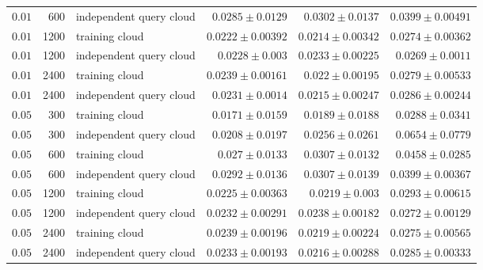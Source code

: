 \begin{longtable}{r r L{0.25\textwidth} r r r}
$0.01$ & 600 & independent query cloud & $0.0285\pm 0.0129$ & $0.0302\pm 0.0137$ & $0.0399\pm 0.00491$ \\
$0.01$ & 1200 & training cloud & $0.0222\pm 0.00392$ & $0.0214\pm 0.00342$ & $0.0274\pm 0.00362$ \\
$0.01$ & 1200 & independent query cloud & $0.0228\pm 0.003$ & $0.0233\pm 0.00225$ & $0.0269\pm 0.0011$ \\
$0.01$ & 2400 & training cloud & $0.0239\pm 0.00161$ & $0.022\pm 0.00195$ & $0.0279\pm 0.00533$ \\
$0.01$ & 2400 & independent query cloud & $0.0231\pm 0.0014$ & $0.0215\pm 0.00247$ & $0.0286\pm 0.00244$ \\
$0.05$ & 300 & training cloud & $0.0171\pm 0.0159$ & $0.0189\pm 0.0188$ & $0.0288\pm 0.0341$ \\
$0.05$ & 300 & independent query cloud & $0.0208\pm 0.0197$ & $0.0256\pm 0.0261$ & $0.0654\pm 0.0779$ \\
$0.05$ & 600 & training cloud & $0.027\pm 0.0133$ & $0.0307\pm 0.0132$ & $0.0458\pm 0.0285$ \\
$0.05$ & 600 & independent query cloud & $0.0292\pm 0.0136$ & $0.0307\pm 0.0139$ & $0.0399\pm 0.00367$ \\
$0.05$ & 1200 & training cloud & $0.0225\pm 0.00363$ & $0.0219\pm 0.003$ & $0.0293\pm 0.00615$ \\
$0.05$ & 1200 & independent query cloud & $0.0232\pm 0.00291$ & $0.0238\pm 0.00182$ & $0.0272\pm 0.00129$ \\
$0.05$ & 2400 & training cloud & $0.0239\pm 0.00196$ & $0.0219\pm 0.00224$ & $0.0275\pm 0.00565$ \\
$0.05$ & 2400 & independent query cloud & $0.0233\pm 0.00193$ & $0.0216\pm 0.00288$ & $0.0285\pm 0.00333$ \\
\end{longtable}
\endgroup

